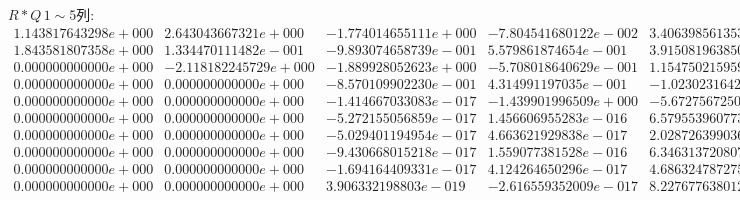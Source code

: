 \begin{landscape}
\newpage
$R\ast Q\,1\sim 5$列:
\[
\begin{matrix}
1.143817643298e+000 & 2.643043667321e+000 & -1.774014655111e+000 & -7.804541680122e-002 & 3.406398561353e-001\\1.843581807358e+000 & 1.334470111482e-001 & -9.893074658739e-001 & 5.579861874654e-001 & 3.915081963850e-002\\0.000000000000e+000 & -2.118182245729e+000 & -1.889928052623e+000 & -5.708018640629e-001 & 1.154750215959e+000\\0.000000000000e+000 & 0.000000000000e+000 & -8.570109902230e-001 & 4.314991197035e-001 & -1.023023164209e+000\\0.000000000000e+000 & 0.000000000000e+000 & -1.414667033083e-017 & -1.439901996509e+000 & -5.672756725063e-001\\0.000000000000e+000 & 0.000000000000e+000 & -5.272155056859e-017 & 1.456606955283e-016 & 6.579553960773e-001\\0.000000000000e+000 & 0.000000000000e+000 & -5.029401194954e-017 & 4.663621929838e-017 & 2.028726399036e-017\\0.000000000000e+000 & 0.000000000000e+000 & -9.430668015218e-017 & 1.559077381528e-016 & 6.346313720807e-017\\0.000000000000e+000 & 0.000000000000e+000 & -1.694164409331e-017 & 4.124264650296e-017 & 4.686324787275e-017\\0.000000000000e+000 & 0.000000000000e+000 & 3.906332198803e-019 & -2.616559352009e-017 & 8.227677638012e-018\\
\end{matrix}\]


\end{landscape}
